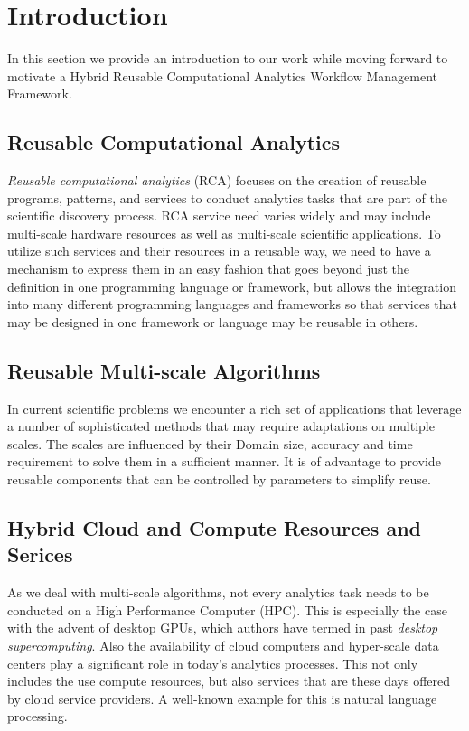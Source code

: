 
\section{Introduction}

In this section we provide an introduction to our work while
moving forward to motivate a 
Hybrid Reusable Computational Analytics Workflow
Management Framework.

\subsection{Reusable Computational Analytics}

{\em Reusable computational analytics} (RCA) focuses on the creation of reusable programs, patterns, and services to conduct analytics tasks that are part of the scientific discovery process. RCA service need varies widely and may include multi-scale hardware resources as well as multi-scale scientific applications. To utilize such services and their resources in a reusable way, we need to have a mechanism to express them in an easy fashion that goes beyond just the definition in one programming language or framework, but allows the integration into many different programming languages and frameworks so that services that may be designed in one framework or language may be reusable in others.

\subsection{Reusable Multi-scale Algorithms}

In current scientific problems we encounter a rich set of applications that leverage a number of sophisticated methods that may require adaptations on multiple scales. The scales are influenced by their Domain size, accuracy and time requirement to solve them in a sufficient manner. It is of advantage to provide reusable components that can be controlled by parameters to simplify reuse.

\subsection{Hybrid Cloud and Compute Resources and Serices}

As we deal with multi-scale algorithms, not every analytics task needs to be conducted on a High Performance Computer (HPC). This is especially the case with the advent of desktop GPUs, which authors have termed in past {\em desktop supercomputing}. Also the availability of cloud computers and hyper-scale data centers play a significant role in today's analytics processes. This not only includes the use compute resources, but also services that are these days offered by cloud service providers. A well-known example for this is natural language processing.

